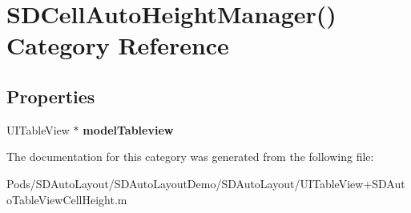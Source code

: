 \hypertarget{category_s_d_cell_auto_height_manager_07_08}{}\section{S\+D\+Cell\+Auto\+Height\+Manager() Category Reference}
\label{category_s_d_cell_auto_height_manager_07_08}
\subsection*{Properties}
\begin{DoxyCompactItemize}
\item 
\mbox{\label{category_s_d_cell_auto_height_manager_07_08_a878e65286caab254adc89fbbc0f66d62}} 
U\+I\+Table\+View $\ast$ {\bfseries model\+Tableview}
\end{DoxyCompactItemize}


The documentation for this category was generated from the following file\+:\begin{DoxyCompactItemize}
\item 
Pods/\+S\+D\+Auto\+Layout/\+S\+D\+Auto\+Layout\+Demo/\+S\+D\+Auto\+Layout/U\+I\+Table\+View+\+S\+D\+Auto\+Table\+View\+Cell\+Height.\+m\end{DoxyCompactItemize}
